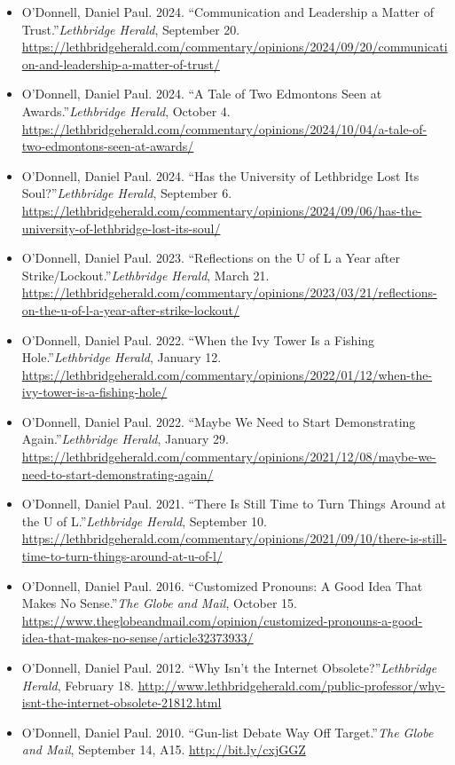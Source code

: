 \documentclass[12pt]{article}
\begin{document}
\begin{itemize}
  \item O’Donnell, Daniel Paul. 2024. “Communication and Leadership a Matter of Trust.”\textit{Lethbridge Herald}, September 20. \url{https://lethbridgeherald.com/commentary/opinions/2024/09/20/communication-and-leadership-a-matter-of-trust/}
  \item O’Donnell, Daniel Paul. 2024. “A Tale of Two Edmontons Seen at Awards.”\textit{Lethbridge Herald}, October 4. \url{https://lethbridgeherald.com/commentary/opinions/2024/10/04/a-tale-of-two-edmontons-seen-at-awards/}
  \item O’Donnell, Daniel Paul. 2024. “Has the University of Lethbridge Lost Its Soul?”\textit{Lethbridge Herald}, September 6. \url{https://lethbridgeherald.com/commentary/opinions/2024/09/06/has-the-university-of-lethbridge-lost-its-soul/}
  \item O’Donnell, Daniel Paul. 2023. “Reflections on the U of L a Year after Strike/Lockout.”\textit{Lethbridge Herald}, March 21. \url{https://lethbridgeherald.com/commentary/opinions/2023/03/21/reflections-on-the-u-of-l-a-year-after-strike-lockout/}
  \item O’Donnell, Daniel Paul. 2022. “When the Ivy Tower Is a Fishing Hole.”\textit{Lethbridge Herald}, January 12. \url{https://lethbridgeherald.com/commentary/opinions/2022/01/12/when-the-ivy-tower-is-a-fishing-hole/}
  \item O’Donnell, Daniel Paul. 2022. “Maybe We Need to Start Demonstrating Again.”\textit{Lethbridge Herald}, January 29. \url{https://lethbridgeherald.com/commentary/opinions/2021/12/08/maybe-we-need-to-start-demonstrating-again/}
  \item O’Donnell, Daniel Paul. 2021. “There Is Still Time to Turn Things Around at the U of L.”\textit{Lethbridge Herald}, September 10. \url{https://lethbridgeherald.com/commentary/opinions/2021/09/10/there-is-still-time-to-turn-things-around-at-u-of-l/}
  \item O’Donnell, Daniel Paul. 2016. “Customized Pronouns: A Good Idea That Makes No Sense.”\textit{The Globe and Mail}, October 15. \url{https://www.theglobeandmail.com/opinion/customized-pronouns-a-good-idea-that-makes-no-sense/article32373933/}
  \item O’Donnell, Daniel Paul. 2012. “Why Isn’t the Internet Obsolete?”\textit{Lethbridge Herald}, February 18. \url{http://www.lethbridgeherald.com/public-professor/why-isnt-the-internet-obsolete-21812.html}
  \item O’Donnell, Daniel Paul. 2010. “Gun-list Debate Way Off Target.”\textit{The Globe and Mail}, September 14, A15. \url{http://bit.ly/cxjGGZ}

\end{itemize}
\end{document}
